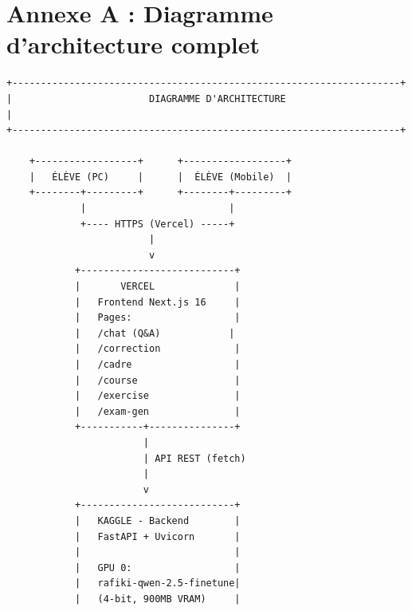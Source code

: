 \documentclass[12pt,a4paper]{report}
\begin{document}
\section{Annexe A : Diagramme d'architecture complet}
\begin{verbatim}
+--------------------------------------------------------------------+
|                        DIAGRAMME D'ARCHITECTURE                     |
+--------------------------------------------------------------------+
                                                                       
    +------------------+      +------------------+                    
    |   ÉLÈVE (PC)     |      |  ÉLÈVE (Mobile)  |                    
    +--------+---------+      +--------+---------+                    
             |                         |                              
             +---- HTTPS (Vercel) -----+                              
                         |                                            
                         v                                            
            +---------------------------+                            
            |       VERCEL              |                            
            |   Frontend Next.js 16     |                            
            |   Pages:                  |                            
            |   /chat (Q&A)            |                            
            |   /correction             |                            
            |   /cadre                  |                            
            |   /course                 |                            
            |   /exercise               |                            
            |   /exam-gen               |                            
            +-----------+---------------+                            
                        |                                            
                        | API REST (fetch)                           
                        |                                            
                        v                                            
            +---------------------------+                            
            |   KAGGLE - Backend        |                            
            |   FastAPI + Uvicorn       |                            
            |                           |                            
            |   GPU 0:                  |                            
            |   rafiki-qwen-2.5-finetune|                            
            |   (4-bit, 900MB VRAM)     |                            

\end{verbatim}
\end{document}
